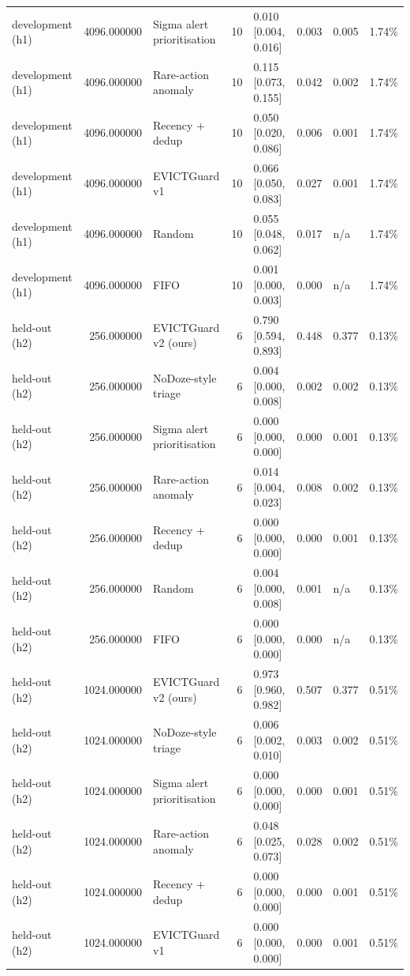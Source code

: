 \begin{tabular}{lrlrllll}
development (h1) & 4096.000000 & Sigma alert prioritisation & 10 & 0.010 [0.004, 0.016] & 0.003 & 0.005 & 1.74\% \\
development (h1) & 4096.000000 & Rare-action anomaly & 10 & 0.115 [0.073, 0.155] & 0.042 & 0.002 & 1.74\% \\
development (h1) & 4096.000000 & Recency + dedup & 10 & 0.050 [0.020, 0.086] & 0.006 & 0.001 & 1.74\% \\
development (h1) & 4096.000000 & EVICTGuard v1 & 10 & 0.066 [0.050, 0.083] & 0.027 & 0.001 & 1.74\% \\
development (h1) & 4096.000000 & Random & 10 & 0.055 [0.048, 0.062] & 0.017 & n/a & 1.74\% \\
development (h1) & 4096.000000 & FIFO & 10 & 0.001 [0.000, 0.003] & 0.000 & n/a & 1.74\% \\
held-out (h2) & 256.000000 & EVICTGuard v2 (ours) & 6 & 0.790 [0.594, 0.893] & 0.448 & 0.377 & 0.13\% \\
held-out (h2) & 256.000000 & NoDoze-style triage & 6 & 0.004 [0.000, 0.008] & 0.002 & 0.002 & 0.13\% \\
held-out (h2) & 256.000000 & Sigma alert prioritisation & 6 & 0.000 [0.000, 0.000] & 0.000 & 0.001 & 0.13\% \\
held-out (h2) & 256.000000 & Rare-action anomaly & 6 & 0.014 [0.004, 0.023] & 0.008 & 0.002 & 0.13\% \\
held-out (h2) & 256.000000 & Recency + dedup & 6 & 0.000 [0.000, 0.000] & 0.000 & 0.001 & 0.13\% \\
held-out (h2) & 256.000000 & Random & 6 & 0.004 [0.000, 0.008] & 0.001 & n/a & 0.13\% \\
held-out (h2) & 256.000000 & FIFO & 6 & 0.000 [0.000, 0.000] & 0.000 & n/a & 0.13\% \\
held-out (h2) & 1024.000000 & EVICTGuard v2 (ours) & 6 & 0.973 [0.960, 0.982] & 0.507 & 0.377 & 0.51\% \\
held-out (h2) & 1024.000000 & NoDoze-style triage & 6 & 0.006 [0.002, 0.010] & 0.003 & 0.002 & 0.51\% \\
held-out (h2) & 1024.000000 & Sigma alert prioritisation & 6 & 0.000 [0.000, 0.000] & 0.000 & 0.001 & 0.51\% \\
held-out (h2) & 1024.000000 & Rare-action anomaly & 6 & 0.048 [0.025, 0.073] & 0.028 & 0.002 & 0.51\% \\
held-out (h2) & 1024.000000 & Recency + dedup & 6 & 0.000 [0.000, 0.000] & 0.000 & 0.001 & 0.51\% \\
held-out (h2) & 1024.000000 & EVICTGuard v1 & 6 & 0.000 [0.000, 0.000] & 0.000 & 0.001 & 0.51\% \\

\end{tabular}
